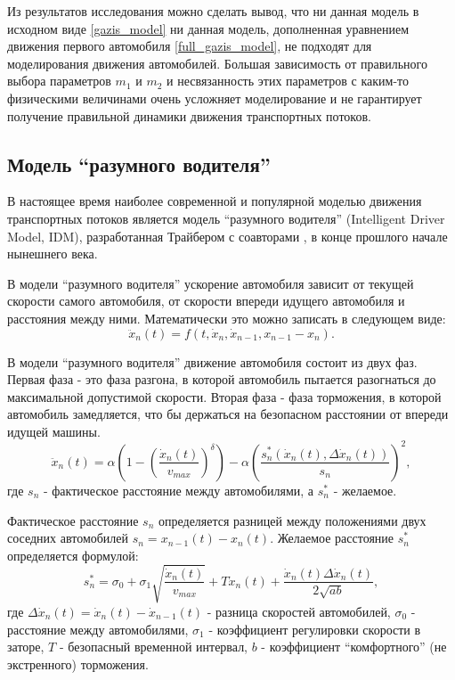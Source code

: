 \documentclass[12pt, a4paper]{extarticle}
\numberwithin{equation}{section}
\numberwithin{figure}{section}
\begin{document}
Из результатов исследования можно сделать вывод, что ни данная модель в исходном виде \eqref{gazis_model} ни данная модель, дополненная уравнением движения первого автомобиля \eqref{full_gazis_model}, не подходят для моделирования движения автомобилей. Большая зависимость от правильного выбора параметров $m_1$ и $m_2$ и несвязанность этих параметров с каким-то физическими величинами очень усложняет моделирование и не гарантирует получение правильной динамики движения транспортных потоков. 

\subsection{Модель ``разумного водителя''}
В настоящее время наиболее современной и популярной моделью движения транспортных потоков является модель ``разумного водителя'' (Intelligent Driver Model, IDM), разработанная Трайбером с соавторами \cite{TreiberModel_1}, \cite{TreiberModel_2} в конце прошлого начале нынешнего века. 

В модели ``разумного водителя'' ускорение автомобиля зависит от текущей скорости самого автомобиля, от скорости впереди идущего автомобиля и расстояния между ними. Математически это можно записать в следующем виде:
\begin{equation*}
\ddot{x}_n(t)=f(t, \dot{x}_n,\dot{x}_{n-1}, x_{n-1}-x_n).
\end{equation*} 

В модели ``разумного водителя'' движение автомобиля состоит из двух фаз. Первая фаза - это фаза разгона, в которой автомобиль пытается разогнаться до максимальной допустимой скорости. Вторая фаза - фаза торможения, в которой автомобиль замедляется, что бы держаться на безопасном расстоянии от впереди идущей машины.
\begin{equation} \label{treiber_model}
\ddot{x}_n(t)= \alpha\left( 1-\left( \dfrac{\dot{x}_n(t)}{v_{max}}\right)^\delta \right) - \alpha\left( \dfrac{s^*_n(\dot{x}_n(t),\Delta \dot{x}_n(t))}{s_n}\right)^2,
\end{equation}
где $s_n$ - фактическое расстояние между автомобилями, а $s^*_n$ - желаемое.

Фактическое расстояние $s_n$ определяется разницей между положениями двух соседних автомобилей $s_n=x_{n-1}(t)-x_n(t)$. Желаемое расстояние  $s^*_n$ определяется формулой:
\begin{equation*}
s^*_n = \sigma_0+\sigma_1\sqrt{\dfrac{ \dot{x}_n(t)}{v_{max}}} +T \dot{x}_n(t)+ \dfrac{ \dot{x}_n(t)\Delta \dot{x}_n(t) }{2\sqrt{ab}},
\end{equation*}
где $\Delta \dot{x}_n(t) = \dot{x}_n(t)- \dot{x}_{n-1}(t)$ - разница скоростей автомобилей, $\sigma_0$ - расстояние между автомобилями, $\sigma_1$ - коэффициент регулировки скорости в заторе, $T$ - безопасный временной интервал, $b$ - коэффициент ``комфортного'' (не экстренного) торможения.
\end{document}
